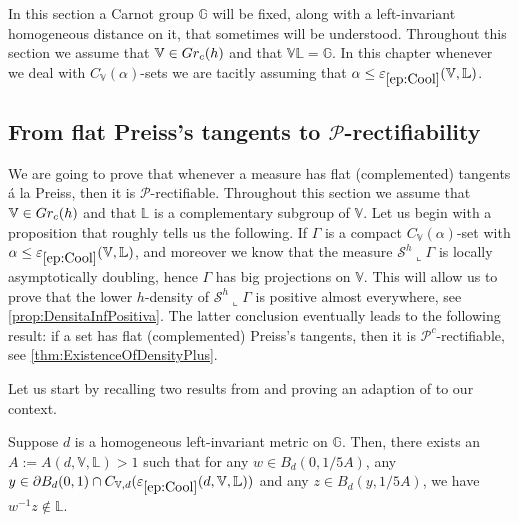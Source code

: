 \documentclass[10pt, a4paper,
oneside, headinclude,footinclude]{scrartcl}
\begin{document}
In this section a Carnot group $\mathbb G$ will be fixed, along with a left-invariant homogeneous distance on it, that sometimes will be understood.
Throughout this section we assume that $\mathbb{V}\in Gr_c(h)$ and that $\mathbb{V}\mathbb{L}=\mathbb{G}$. In this chapter whenever we deal with $C_{\mathbb V}(\alpha)$-sets we are tacitly assuming that $\alpha\leq\oldep{ep:Cool}(\mathbb V,\mathbb L)$.
\medskip

\subsection{From flat Preiss's tangents to $\mathscr{P}$-rectifiability}

We are going to prove that whenever a measure has flat (complemented) tangents \'a la Preiss, then it is $\mathscr{P}$-rectifiable. Throughout this section we assume that $\mathbb{V}\in Gr_c(h)$ and that $\mathbb L$ is a complementary subgroup of $\mathbb V$. Let us begin with a proposition that roughly tells us the following. If $\Gamma$ is a compact $C_{\mathbb V}(\alpha)$-set with $\alpha\leq \oldep{ep:Cool}(\mathbb V,\mathbb L)$, and moreover we know that the measure $\mathcal{S}^h\llcorner\Gamma$ is locally asymptotically doubling, hence $\Gamma$ has big projections on $\mathbb V$. This will allow us to prove that the lower $h$-density of $\mathcal{S}^h\llcorner\Gamma$ is positive almost everywhere, see \cref{prop:DensitaInfPositiva}. The latter conclusion eventually leads to the following result: if a set has flat (complemented) Preiss's tangents, then it is $\mathscr{P}^c$-rectifiable, see \cref{thm:ExistenceOfDensityPlus}. %

Let us start by recalling two results from \cite{antonelli2020rectifiable} and proving an adaption of \cite[Proposition 4.6]{antonelli2020rectifiable} to our context. 

\begin{lemma}\label{lemma:tec.cono}
Suppose $d$ is a homogeneous left-invariant metric on $\mathbb{G}$. Then, there exists an $A:= A(d,\mathbb V,\mathbb L)>1$ such that for any $w\in B_d(0,1/5A)$, any $y\in \partial B_d(0,1)\cap C_{\mathbb{V},d}(\oldep{ep:Cool}(d,\mathbb{V},\mathbb{L}))$ and any $z\in B_d(y,1/5A)$, we have
$w^{-1}z\not\in \mathbb{L}$.
\end{lemma}
\end{document}
